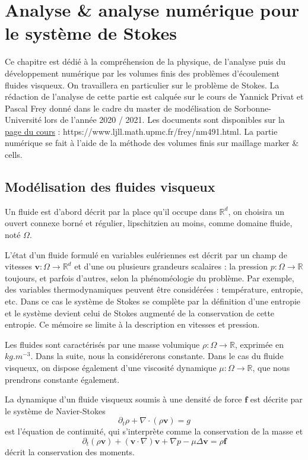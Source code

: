 \chapter{Analyse \& analyse numérique pour le système de Stokes}

Ce chapitre est dédié à la compréhension de la physique, de l'analyse puis du développement numérique par les volumes finis des problèmes d'écoulement fluides visqueux. On travaillera en particulier sur le problème de Stokes. La rédaction de l'analyse de cette partie est calquée sur le cours de Yannick Privat et Pascal Frey donné dans le cadre du master de modélisation de Sorbonne-Université lors de l'année 2020 / 2021. Les documents sont disponibles sur la \href{https://www.ljll.math.upmc.fr/frey/nm491.html}{page du cours} : https://www.ljll.math.upmc.fr/frey/nm491.html. La partie numérique se fait à l'aide de la méthode des volumes finis sur maillage marker \& cells. 

\section{Modélisation des fluides visqueux}

Un fluide est d'abord décrit par la place qu'il occupe dans $\mathbb{R}^d$, on choisira un ouvert connexe borné et régulier, lipschitzien au moins, comme domaine fluide, noté $\Omega$.

L'état d'un fluide formulé en variables eulériennes est décrit par un champ de vitesses $\mathbf{v} : \Omega \rightarrow \mathbb{R}^d$ et d'une ou plusieurs grandeurs scalaires : la pression $p : \Omega \rightarrow \mathbb{R}$ toujours, et parfois d'autres, selon la phénoméologie du problème. Par exemple, des variables thermodynamiques peuvent être considérées : température, entropie, etc. Dans ce cas le système de Stokes se complète par la définition d'une entropie et le système devient celui de Stokes augmenté de la conservation de cette entropie. Ce mémoire se limite à la description en vitesses et pression. 

Les fluides sont caractérisés par une masse volumique $\rho : \Omega \rightarrow \mathbb{R}$, exprimée en $kg.m^{-3}$. Dans la suite, nous la considérerons constante. Dans le cas du fluide visqueux, on dispose également d'une viscosité dynamique $\mu : \Omega \rightarrow \mathbb{R}$, que nous prendrons constante également.

La dynamique d'un fluide visqueux soumis à une densité de force $\mathbf{f}$ est décrite par le système de Navier-Stokes
\begin{equation*}
    \partial_t \rho + \nabla \cdot (\rho \mathbf{v}) = g
\end{equation*}
est l'équation de continuité, qui s'interprète comme la conservation de la masse et 
\begin{equation*} \tag{N-S}
    \partial_t (\rho \mathbf{v}) + (\mathbf{v} \cdot \nabla) \mathbf{v} + \nabla p - \mu \Delta \mathbf{v} = \rho \mathbf{f}
\end{equation*}
décrit la conservation des moments.

